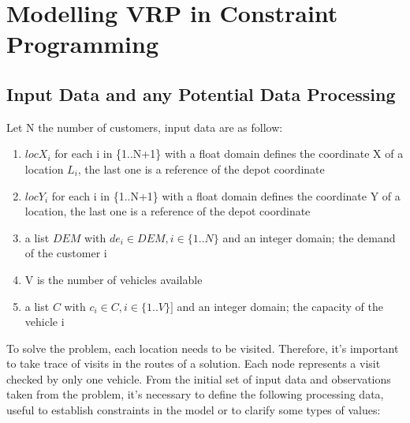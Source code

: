 \chapter{Modelling VRP in Constraint Programming}
\section{Input Data and any Potential Data Processing}
Let N the number of customers, input data are as follow:
\begin{enumerate}
    \item \begin{math}locX_{i}\end{math} for each i in \{1..N+1\} with a float domain defines the coordinate X of a location \begin{math}L_{i}\end{math}, the last one is a reference of the depot coordinate 
    \item \begin{math}locY_{i}\end{math} for each i in \{1..N+1\} with a float domain defines the coordinate Y of a location, the last one is a reference of the depot coordinate
    \item a list \begin{math}DEM\end{math} with \begin{math}de_{i} \in DEM, i \in \{1..N\}\end{math} and an integer domain; the demand of the customer i
    \item V is the number of vehicles available
    \item a list \begin{math}C\end{math} with \begin{math} c_{i} \in C, i \in \{1..V\}]\end{math} and an integer domain; the capacity of the vehicle i
\end{enumerate}
To solve the problem, each location needs to be visited. Therefore, it's important to take trace of visits in the routes of a solution. Each node represents a visit checked by only one vehicle. 
From the initial set of input data and observations taken from the problem, it's necessary to define the following processing data, useful to establish constraints in the model or to clarify some types of values:
